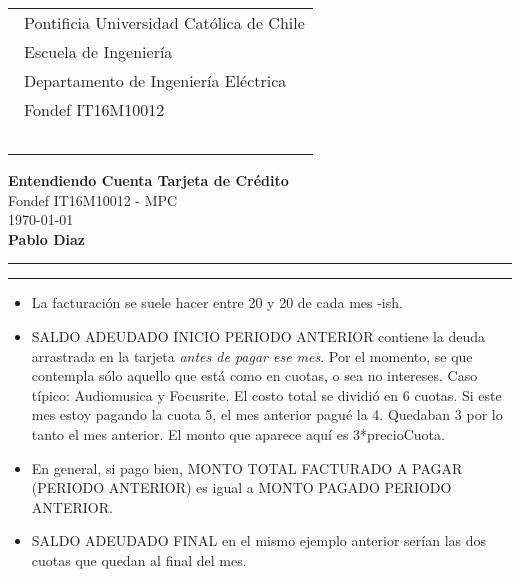 \documentclass{article}
\begin{document}
\thispagestyle{empty}


\hspace*{2cm}
 \begin{tabular}{l}
  {\ Pontificia Universidad Católica de Chile}\\
  {\ Escuela de Ingeniería}\\
  {\ Departamento de Ingeniería Eléctrica}\\
  {\ Fondef IT16M10012 }\\
  {\  }\\
 \end{tabular}
 \hfill 
\vspace*{-0.2cm}
\begin{center}
{\Large\bf Entendiendo Cuenta Tarjeta de Crédito}\\
\vspace*{2mm}
{\Large Fondef IT16M10012 - MPC}\\
{\today{}}\\
\vspace*{1mm}
{\bf Pablo Diaz }\\
\vspace*{1mm}
\end{center}
\hrule\vspace*{2pt}\hrule
\setcounter{page}{1}
\begin{itemize}
\item La facturación se suele hacer entre 20 y 20 de cada mes -ish.
\item SALDO ADEUDADO INICIO PERIODO ANTERIOR contiene la deuda arrastrada en la tarjeta \emph{antes de pagar ese mes}. Por el momento, se que contempla {\color{red} sólo aquello que está como en cuotas, o sea no intereses.} Caso típico: Audiomusica y Focusrite. El costo total se dividió en 6 cuotas. Si {\color{red} este} mes estoy pagando la cuota 5, el mes {\color{red}anterior} pagué la 4. Quedaban 3 por lo tanto {\color{red} el mes anterior}. El monto que aparece aquí es {\color{red}3}*precioCuota. 
\item En general, si pago bien, MONTO TOTAL FACTURADO A PAGAR (PERIODO ANTERIOR) es igual a MONTO PAGADO PERIODO ANTERIOR.
\item SALDO ADEUDADO FINAL en el mismo ejemplo anterior serían las dos cuotas que quedan al final del mes.
\end{itemize}
\end{document}
